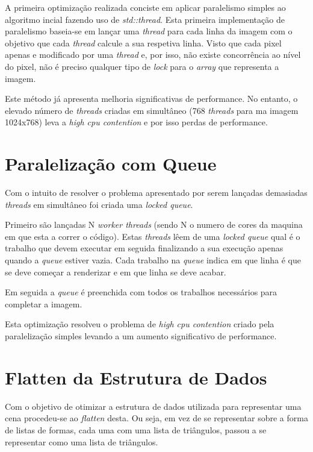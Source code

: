 \documentclass[a4paper]{report}
\begin{document}
A primeira optimização realizada conciste em aplicar paralelismo simples ao
algoritmo incial fazendo uso de \textit{std::thread}. Esta primeira implementação de
paralelismo baseia-se em lançar uma \textit{thread} para cada linha da imagem
com o objetivo que cada \textit{thread} calcule a sua respetiva linha. Visto que
cada pixel apenas e modificado por uma \textit{thread} e, por isso, não existe
concorrência ao nível do pixel, não é preciso qualquer tipo de \textit{lock}
para o \textit{array} que representa a imagem.

Este método já apresenta melhoria significativas de performance. No entanto, o
elevado número de \textit{threads} criadas em simultâneo (768 \textit{threads}
para ma imagem 1024x768) leva a \textit{high cpu contention} e por isso perdas
de performance.

\section{Paralelização com Queue}

Com o intuito de resolver o problema apresentado por serem lançadas demasiadas
\textit{threads} em simultâneo foi criada uma \textit{locked queue}.

Primeiro são lançadas N \textit{worker threads} (sendo N o numero de cores da
maquina em que esta a correr o código). Estas \textit{threads} lêem de uma
\textit{locked queue} qual é o trabalho que devem executar em seguida
finalizando a sua execução apenas quando a \textit{queue} estiver vazia. Cada
trabalho na \textit{queue} indica em que linha é que se deve começar a
renderizar e em que linha se deve acabar.

Em seguida a \textit{queue} é preenchida com todos os trabalhos necessários para
completar a imagem.

Esta optimização resolveu o problema de \textit{high cpu contention} criado pela
paralelização simples levando a um aumento significativo de performance.

\section{Flatten da Estrutura de Dados}

Com o objetivo de otimizar a estrutura de dados utilizada para representar uma
cena procedeu-se ao \textit{flatten} desta. Ou seja, em vez de se representar
sobre a forma de listas de formas, cada uma com uma lista de triângulos, passou
a se representar como uma lista de triângulos.
\end{document}
